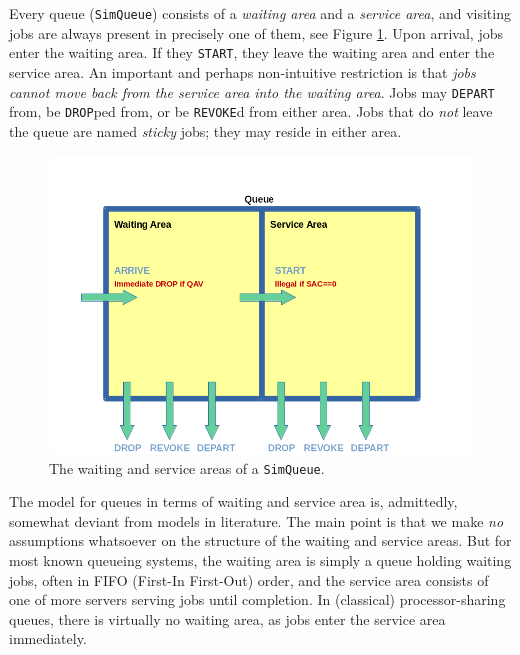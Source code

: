 Every queue (\lstinline|SimQueue|) consists of
  a {\em waiting area\/} and a {\em service area},
  and visiting jobs are always present in precisely
  one of them,
  see Figure \ref{fig:WaitingAndServiceArea}.
Upon arrival, jobs enter the waiting area.
If they \lstinline|START|,
  they leave the waiting area and
  enter the service area.
An important and perhaps non-intuitive restriction
  is that {\em jobs cannot move back from the service area
  into the waiting area}.
Jobs may \lstinline|DEPART| from,
  be \lstinline|DROP|ped from,
  or be \lstinline|REVOKE|d from
  either area.
Jobs that do {\em not\/} leave the queue
  are named {\em sticky\/} jobs;
  they may reside in either area.

\begin{figure}[h]
\label{fig:WaitingAndServiceArea}
\caption{The waiting and service areas of a \texttt{SimQueue}.}
\includegraphics[width=\textwidth]{fig/WaitingAndServiceArea}
\end{figure}

The model for queues in terms of waiting and service area is,
  admittedly, somewhat deviant from models in literature.
The main point is that we make {\em no\/} assumptions
  whatsoever on the structure of the waiting and service areas.
But for most known queueing systems,
  the waiting area is simply a queue holding waiting jobs,
  often in FIFO (First-In First-Out) order,
  and the service area consists of one of more servers
  serving jobs until completion.
In (classical) processor-sharing queues,
  there is virtually no waiting area,
  as jobs enter the service area immediately.

